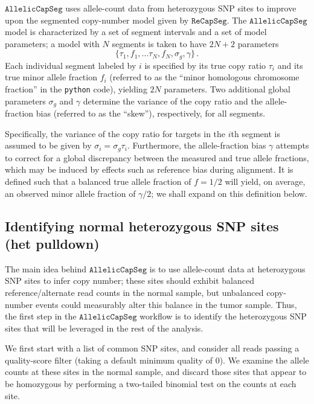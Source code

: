 \documentclass[nofootinbib,amssymb,amsmath]{revtex4}
\newcommand{\RCS}{\texttt{ReCapSeg}}
\newcommand{\ACS}{\texttt{AllelicCapSeg}}
\begin{document}
$\ACS$ uses allele-count data from heterozygous SNP sites to improve upon the segmented copy-number model given by $\RCS$. The $\ACS$ model is characterized by a set of segment intervals and a set of model parameters; a model with $N$ segments is taken to have $2N + 2$ parameters
\begin{equation}
\{\tau_1, f_1, \dots \tau_N, f_N, \sigma_g, \gamma\}\,.
\end{equation}
Each individual segment labeled by $i$ is specified by its true copy ratio $\tau_i$ and its true minor allele fraction $f_i$ (referred to as the ``minor homologous chromosome fraction'' in the \texttt{python} code), yielding $2N$ parameters. Two additional global parameters $\sigma_g$ and $\gamma$ determine the variance of the copy ratio and the allele-fraction bias (referred to as the ``skew''), respectively, for all segments.

Specifically, the variance of the copy ratio for targets in the $i$th segment is assumed to be given by $\sigma_i = \sigma_g \tau_i$. Furthermore, the allele-fraction bias $\gamma$ attempts to correct for a global discrepancy between the measured and true allele fractions, which may be induced by effects such as reference bias during alignment.  It is defined such that a balanced true allele fraction of $f = 1/2$ will yield, on average, an observed minor allele fraction of $\gamma/2$; we shall expand on this definition below.

\subsection{Identifying normal heterozygous SNP sites (het pulldown)} \label{identifying-normal-heterozygous-snp-sites}

The main idea behind $\ACS$ is to use allele-count data at heterozygous SNP sites to infer copy number; these sites should exhibit balanced reference/alternate read counts in the normal sample, but unbalanced copy-number events could measurably alter this balance in the tumor sample. Thus, the first step in the $\ACS$ workflow is to identify the heterozygous SNP sites that will be leveraged in the rest of the analysis.  

We first start with a list of common SNP sites, and consider all reads passing a quality-score filter (taking a default minimum quality of 0).  We examine the allele counts at these sites in the normal sample, and discard those sites that appear to be homozygous by performing a two-tailed binomial test on the counts at each site.
\end{document}
